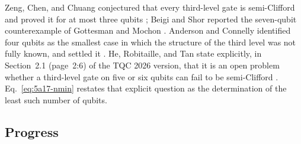 Zeng, Chen, and Chuang conjectured that every third-level gate is
semi-Clifford and proved it for at most three qubits
; Beigi and Shor reported the seven-qubit
counterexample of Gottesman and Mochon .
Anderson and Connelly identified four qubits as the smallest case in which the
structure of the third level was not fully known, and settled it
.  He, Robitaille, and Tan state explicitly, in
Section~2.1 (page~2:6) of the TQC 2026 version, that it is an open problem
whether a third-level gate on five or six qubits can fail to be semi-Clifford
.  Eq.~\eqref{eq:5a17-nmin} restates that
explicit question as the determination of the least such number of qubits.

\subsection*{Progress}

